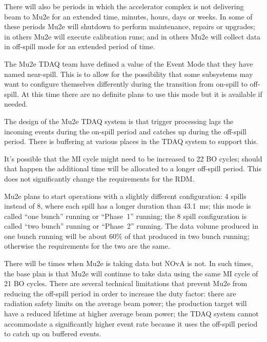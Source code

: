There will also be periods in which the accelerator complex is not delivering
beam to Mu2e for an extended time, minutes, hours, days or weeks.
In some of these periods Mu2e will shutdown to perform maintenance, repairs or upgrades;
in others Mu2e will execute calibration runs;
and in others Mu2e will collect data in off-spill mode for an extended period of time.


The Mu2e TDAQ team have defined a value of the Event Mode that they have named near-spill.
This is to allow for the possibility that some subsystems may want to
configure themselves differently during the transition from on-spill to off-spill.
At this time there are no definite plans to use this mode but it is available if needed.

The design of the Mu2e TDAQ system is that trigger processing lags the incoming events
during the on-spill period and catches up during the off-spill period.  There is
buffering at various places in the TDAQ system to support this.

It's possible that the MI cycle might need to be increased to 22 BO cycles;
should that happen the additional time will be allocated to a longer off-spill period.
This does not significantly change the requirements for the RDM.

Mu2e plans to start operations with a slightly different configuration:
4 spills instead of 8, where each spill has a longer duration than 43.1~ms;
this mode is called ``one bunch'' running or ``Phase~1'' running;
the 8 spill configuration is called ``two bunch'' running or ``Phase~2'' running.
The data volume produced in one bunch running will be about 60\% of that produced
in two bunch running; otherwise the requirements for the two are the same.

There will be times when Mu2e is taking data but NOvA is not.
In such times, the base plan is that Mu2e will continue to take data using the same MI cycle of 21 BO cycles.
There are several technical limitations that prevent Mu2e from reducing the off-spill period
in order to increase the duty factor:
there are radiation safety limits on the average beam power;
the production target will have a reduced lifetime at higher average beam power;
the TDAQ system cannot accommodate a significantly higher event rate because it
uses the off-spill period to catch up on buffered events.


